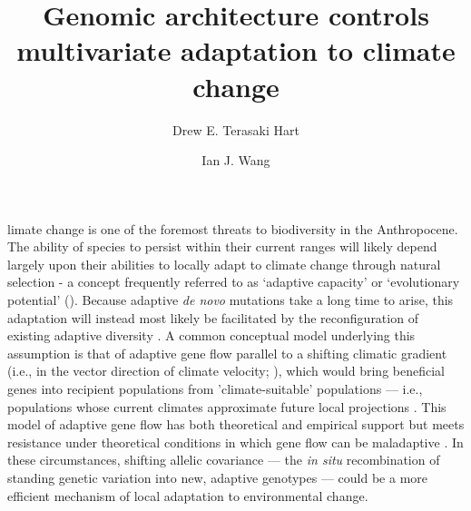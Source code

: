 \documentclass[9pt,twocolumn,twoside,lineno]{pnas-new}
\title{Genomic architecture controls multivariate adaptation to climate change}
\author[a,1]{Drew E. Terasaki Hart}
\author[a]{Ian J. Wang}
\affil[a]{Department of Environmental Science, Policy, and Management, University of California, Berkeley, CA 94720}
\begin{document}
\maketitle
\thispagestyle{firststyle}


limate change is one of the foremost threats to biodiversity in the Anthropocene.
The ability of species to persist within their current ranges will likely depend largely upon their abilities to
locally adapt to climate change through natural selection - a concept frequently referred to 
as `adaptive capacity’ or `evolutionary potential’ (\cite{chevin,harrisson,nicotra,vilas,wade}).
Because adaptive \textit{de novo} mutations take a long time to arise,
this adaptation will instead most likely be facilitated
by the reconfiguration of existing adaptive diversity \cite{bomblies}.
A common conceptual model underlying this assumption is that of
adaptive gene flow parallel to a shifting climatic gradient
(i.e., in the vector
direction of climate velocity; \cite{ackerly}),
which would bring beneficial genes into recipient populations
from 'climate-suitable' populations --- i.e., populations whose
current climates approximate future local projections \cite{bellis}.
This model of adaptive gene flow has both theoretical
\cite{aitken_whitlock,slatkin,tigano}
and empirical 
\cite{feder,bell}
support
but meets resistance under theoretical conditions in which gene flow can be maladaptive
\cite{wang,lenormand,slatkin,haldane,wright,felsenstein}.
In these circumstances, shifting allelic covariance --- 
 the \textit{in situ} recombination of standing genetic variation into new,
adaptive genotypes --- could be a more efficient mechanism of local adaptation to environmental change.
\end{document}
